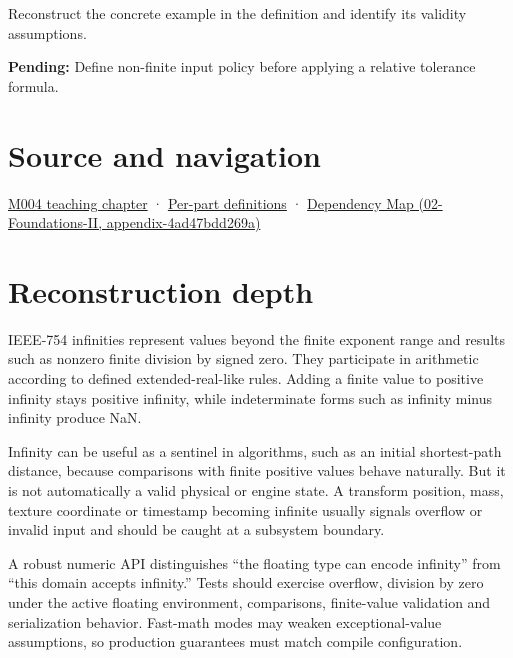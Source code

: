 Reconstruct the concrete example in the definition and identify its validity assumptions.

\textbf{Pending:} Define non-finite input policy before applying a relative tolerance formula.

\section{Source and navigation}\label{appendix-eb336149c00a-source-and-navigation}

\href{Continuous\%20Notes/Computing\%20Foundations\%20-\%20From\%20Bits\%20to\%20C++\%20and\%20Systems\%20APIs\#A\%20stretching\%20ruler\%20for\%20real-valued\%20quantities}{M004 teaching chapter} · \hyperref[appendix-fd090d982a15-m004---parts-61-76]{Per-part definitions} · \href{../02-Foundations-II/main.pdf\#nameddest=appendix-4ad47bdd269a}{Dependency Map (02-Foundations-II, appendix-4ad47bdd269a)}

\section{Reconstruction depth}\label{appendix-eb336149c00a-reconstruction-depth}

IEEE-754 infinities represent values beyond the finite exponent range and results such as nonzero finite division by signed zero. They participate in arithmetic according to defined extended-real-like rules. Adding a finite value to positive infinity stays positive infinity, while indeterminate forms such as infinity minus infinity produce NaN.

Infinity can be useful as a sentinel in algorithms, such as an initial shortest-path distance, because comparisons with finite positive values behave naturally. But it is not automatically a valid physical or engine state. A transform position, mass, texture coordinate or timestamp becoming infinite usually signals overflow or invalid input and should be caught at a subsystem boundary.

A robust numeric API distinguishes ``the floating type can encode infinity'' from ``this domain accepts infinity.'' Tests should exercise overflow, division by zero under the active floating environment, comparisons, finite-value validation and serialization behavior. Fast-math modes may weaken exceptional-value assumptions, so production guarantees must match compile configuration.
